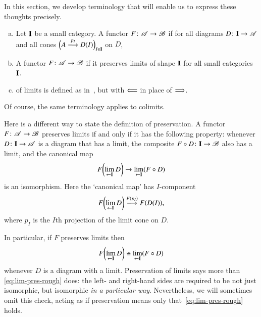 In this section, we develop terminology that will enable us to express
these thoughts precisely.

\begin{defn}
\begin{enumerate}[(b)]
\item   
\label{defn:pres-lims-shape}
Let $\mathbf{I}$ be a small category.  A functor $F\from \cat{A} \to \cat{B}$
 if for all diagrams $D\from \scat{I} \to
\cat{A}$ and all cones $\Bigl(A \stackrel{p_I}{\longrightarrow} D(I)\Bigr)_{I \in \mathbf{I}}$ on
$D$,
% 

\item   
\label{defn:pres-lims-all}
A functor $F\from \cat{A} \to \cat{B}$  if it
preserves limits of shape $\mathbf{I}$ for all small categories $\mathbf{I}$.

\item 
{}%
%
%
%
of limits is defined as in~, but with $\Longleftarrow$
in place of $\Longrightarrow$.
\end{enumerate}
\end{defn}
% 
Of course, the same terminology applies to colimits.

Here is a different way to state the definition of preservation.  A functor
$F\from \cat{A} \to \cat{B}$ preserves limits if and only if it has the
following property: whenever $D\from \scat{I} \to \cat{A}$ is a diagram
that has a limit, the composite $F \of D \from \scat{I} \to \cat{B}$ also
has a limit, and the canonical map
\[
F \biggl( \lim\limits_{\leftarrow \mathbf{I}} D \biggr)
\to
\lim\limits_{\leftarrow \mathbf{I}}(F \mathbin{\circ} D)
\]
is an isomorphism.  Here the `canonical map' has $I$-component 
\[
F \biggl( \lim\limits_{\leftarrow \mathbf{I}} D \biggr)
\stackrel{F(p_I)}{\longrightarrow}
F(D(I)),
\]
where $p_I$ is the $I$th projection of the limit cone on $D$.

In particular, if $F$ preserves limits then
% 
\begin{equation}
\label{eq:lim-pres-rough}
F \biggl( \lim\limits_{\leftarrow \mathbf{I}} D \biggr)
\cong
\lim\limits_{\leftarrow \mathbf{I}}(F \mathbin{\circ} D)
\end{equation}
% 
whenever $D$ is a diagram with a limit.  Preservation of limits says more
than \eqref{eq:lim-pres-rough} does: the left- and right-hand sides are
required to be not just isomorphic, but isomorphic \emph{in a particular
  way}.  Nevertheless, we will sometimes omit this check, acting as if
preservation means only that~\eqref{eq:lim-pres-rough} holds.

